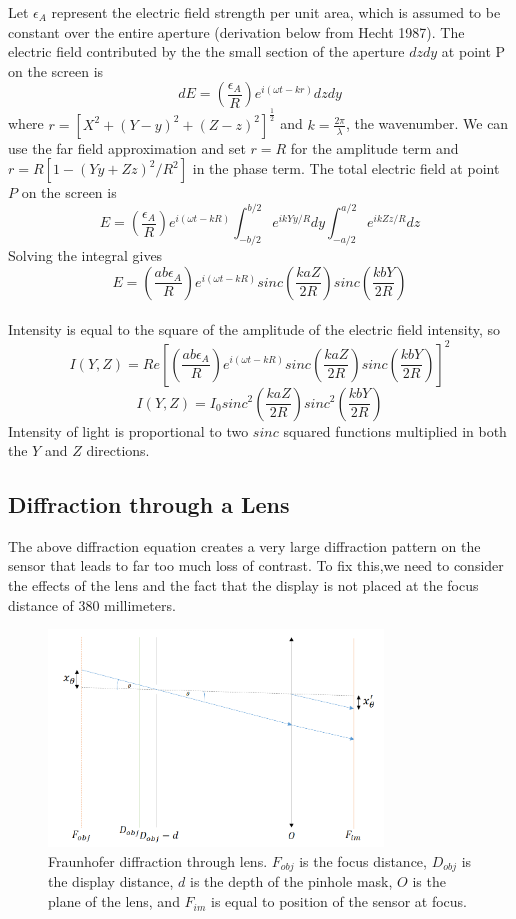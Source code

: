 \documentclass{acmsiggraph}
\begin{document}
Let $\epsilon_A$ represent the electric field strength per unit area, which is assumed to be constant over the entire aperture (derivation below from Hecht 1987). The electric field contributed by the the small section of the aperture $dzdy$ at point P on the screen is 
$$dE = \left(\frac{\epsilon_A}{R} \right)e^{i(\omega t-kr)}dzdy$$
where $r = [X^2 + (Y-y)^2+(Z-z)^2]^{\frac{1}{2}}$ and $k = \frac{2 \pi}{\lambda}$, the wavenumber. We can use the far field approximation and set $r = R$ for the amplitude term and $r = R[1-(Yy+Zz)^2/{R^2}]$ in the phase term. The total electric field at point $P$ on the screen is \\
$$E = \left(\frac{\epsilon_{A}}{R}\right)e^{i(\omega t-kR)} \int_{-b/2}^{b/2} e^{ikYy/R}dy \int_{-a/2}^{a/2} e^{ikZz/R} dz $$
Solving the integral gives \\
$$E = \left(\frac{ab\epsilon_A}{R}\right) e^{i(\omega t-kR)} sinc\left(\frac{kaZ}{2R}\right)sinc\left(\frac{kbY}{2R}\right) $$ \\
Intensity is equal to the square of the amplitude of the electric field intensity, so \\
$$I(Y,Z) = Re\left[\left(\frac{ab\epsilon_A}{R}\right)e^{i(\omega t - kR)} sinc\left(\frac{kaZ}{2R}\right) sinc\left(\frac{kbY}{2R}\right)\right]^2$$
$$I(Y,Z) = I_0  sinc^2\left(\frac{kaZ}{2R}\right) sinc^2\left(\frac{kbY}{2R}\right)$$
Intensity of light is proportional to two $sinc$ squared functions multiplied in both the $Y$ and $Z$ directions.


\subsection{Diffraction through a Lens}
The above diffraction equation creates a very large diffraction pattern on the sensor that leads to far too much loss of contrast. To fix this,we need to consider the effects of the lens and the fact that the display is not placed at the focus distance of 380 millimeters. 

\begin{figure}[ht]
  \centering
  \includegraphics[width=3.5in]{Lens_Diffraction.png}
  \caption{Fraunhofer diffraction through lens. $F_{obj}$ is the focus distance, $D_{obj}$ is the display distance, $d$ is the depth of the pinhole mask, $O$ is the plane of the lens, and $F_{im}$ is equal to position of the sensor at focus.}
  \label{fig:ferrari}
\end{figure}
\end{document}
